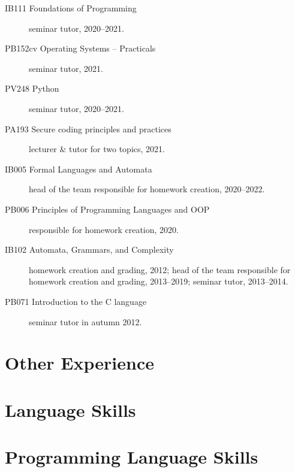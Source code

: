 \documentclass[11pt,a4paper,roman]{moderncv}        %
\begin{document}
\begin{description}
		\item[IB111 Foundations of Programming] seminar tutor, 2020--2021.

		\item[PB152cv Operating Systems – Practicals] seminar tutor, 2021.

		\item[PV248 Python] seminar tutor, 2020--2021.

		\item[PA193 Secure coding principles and practices] lecturer \& tutor for two topics, 2021.


        \item[IB005 Formal Languages and Automata] head of the team responsible for homework creation, 2020--2022.

		\item[PB006 Principles of Programming Languages and OOP] responsible for homework creation, 2020.


        \item[IB102 Automata, Grammars, and Complexity] homework creation and grading, 2012; head of the team responsible for homework creation and grading, 2013--2019; seminar tutor, 2013--2014.

        \item[PB071 Introduction to the C language] seminar tutor in autumn 2012.
    \end{description}
    \endgroup

\section{Other Experience}


\section{Language Skills}


\section{Programming Language Skills}


\nocite{*}
\printbibliography[title={Publications}]
\end{document}
